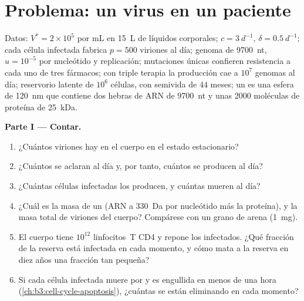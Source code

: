 \section{Problema: un virus en un paciente}

\begin{problem}
\label{pb:b3:virology:1}
Datos:  $V^{*} = 2\times 10^{5}$ por mL en \qty{15}{L} de
líquidos corporales; $c = \qty{3}{d^{-1}}$, $\delta = \qty{0.5}{d^{-1}}$;
cada célula infectada fabrica $p = 500$ viriones al día; genoma de
\qty{9700}{nt}, $u = 10^{-5}$ por nucleótido y replicación; mutaciones
únicas confieren resistencia a cada uno de tres fármacos; con triple
terapia la producción cae a $10^{7}$ genomas al día; reservorio latente
de $10^{6}$ células, con semivida de $44$ meses; un  es una esfera
de \qty{120}{nm} que contiene dos hebras de ARN de \qty{9700}{nt} y unas
\num{2000} moléculas de proteína de \qty{25}{kDa}.

\medskip
\noindent\textbf{Parte I --- Contar.}
\begin{enumerate}
  \item ¿Cuántos viriones hay en el cuerpo en el estado estacionario?
  \item ¿Cuántos se aclaran al día y, por tanto, cuántos se producen al
        día?
  \item ¿Cuántas células infectadas los producen, y cuántas mueren al
        día?
  \item ¿Cuál es la masa de un  (ARN a \qty{330}{Da} por nucleótido
        más la proteína), y la masa total de viriones del cuerpo?
        Compárese con un grano de arena (\qty{1}{mg}).
  \item El cuerpo tiene $10^{12}$ linfocitos~T CD4 y repone los
        infectados. ¿Qué fracción de la reserva está infectada en cada
        momento, y cómo mata a la reserva en diez años una fracción tan
        pequeña?
  \item Si cada célula infectada muere por  y es engullida en
        menos de una hora (\cref{ch:b3:cell-cycle-apoptosis}), ¿cuántas
        se están eliminando en cada momento?
\end{enumerate}


\end{problem}
